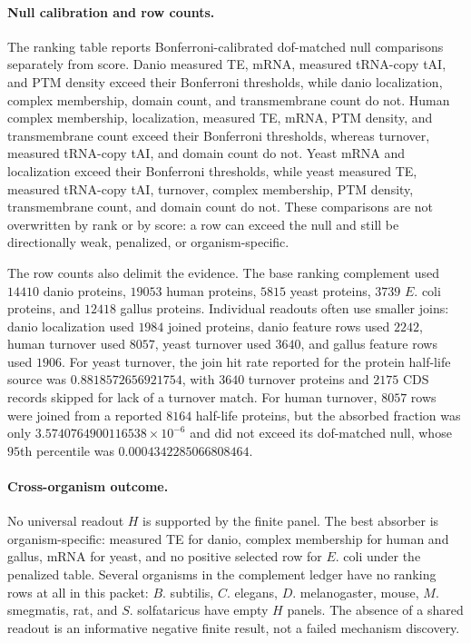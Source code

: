 \paragraph{Null calibration and row counts.}
The ranking table reports Bonferroni-calibrated dof-matched null comparisons separately from score.  Danio measured TE, mRNA, measured tRNA-copy tAI, and PTM density exceed their Bonferroni thresholds, while danio localization, complex membership, domain count, and transmembrane count do not.  Human complex membership, localization, measured TE, mRNA, PTM density, and transmembrane count exceed their Bonferroni thresholds, whereas turnover, measured tRNA-copy tAI, and domain count do not.  Yeast mRNA and localization exceed their Bonferroni thresholds, while yeast measured TE, measured tRNA-copy tAI, turnover, complex membership, PTM density, transmembrane count, and domain count do not.  These comparisons are not overwritten by rank or by score: a row can exceed the null and still be directionally weak, penalized, or organism-specific.

The row counts also delimit the evidence.  The base ranking complement used $14410$ danio proteins, $19053$ human proteins, $5815$ yeast proteins, $3739$ $E.$ coli proteins, and $12418$ gallus proteins.  Individual readouts often use smaller joins: danio localization used $1984$ joined proteins, danio feature rows used $2242$, human turnover used $8057$, yeast turnover used $3640$, and gallus feature rows used $1906$.  For yeast turnover, the join hit rate reported for the protein half-life source was $0.8818572656921754$, with $3640$ turnover proteins and $2175$ CDS records skipped for lack of a turnover match.  For human turnover, $8057$ rows were joined from a reported $8164$ half-life proteins, but the absorbed fraction was only $3.5740764900116538\times 10^{-6}$ and did not exceed its dof-matched null, whose $95$th percentile was $0.0004342285066808464$.

\paragraph{Cross-organism outcome.}
No universal readout $H$ is supported by the finite panel.  The best absorber is organism-specific: measured TE for danio, complex membership for human and gallus, mRNA for yeast, and no positive selected row for $E.$ coli under the penalized table.  Several organisms in the complement ledger have no ranking rows at all in this packet: $B.$ subtilis, $C.$ elegans, $D.$ melanogaster, mouse, $M.$ smegmatis, rat, and $S.$ solfataricus have empty $H$ panels.  The absence of a shared readout is an informative negative finite result, not a failed mechanism discovery.

